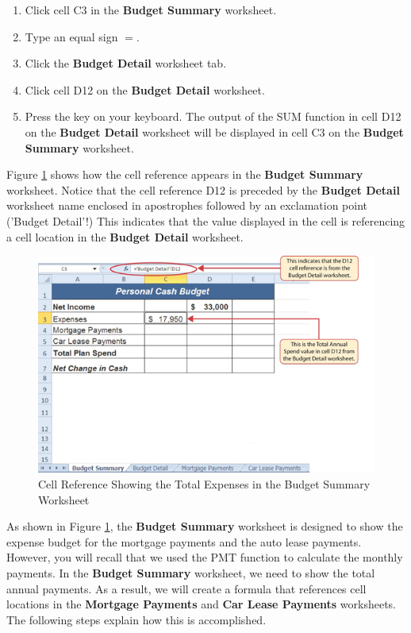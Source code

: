\begin{enumerate}
	\item Click cell \textsf{C3} in the \textbf{Budget Summary} worksheet.
	\item Type an equal sign $ = $.
	\item Click the \textbf{Budget Detail} worksheet tab.
	\item Click cell \textsf{D12} on the \textbf{Budget Detail} worksheet.
	\item Press the  key on your keyboard. The output of the SUM function in cell \textsf{D12} on the \textbf{Budget Detail} worksheet will be displayed in cell \textsf{C3} on the \textbf{Budget Summary} worksheet.
\end{enumerate}

Figure \ref{02:fig36} shows how the cell reference appears in the \textbf{Budget Summary} worksheet. Notice that the cell reference \textsf{D12} is preceded by the \textbf{Budget Detail} worksheet name enclosed in apostrophes followed by an exclamation point ('Budget Detail'!) This indicates that the value displayed in the cell is referencing a cell location in the \textbf{Budget Detail} worksheet.

\begin{figure}[H]
	\centering
	\includegraphics[width=\maxwidth{.95\linewidth}]{gfx/ch02_fig36}
	\caption{Cell Reference Showing the Total Expenses in the Budget Summary Worksheet}
	\label{02:fig36}
\end{figure}

As shown in Figure \ref{02:fig36}, the \textbf{Budget Summary} worksheet is designed to show the expense budget for the mortgage payments and the auto lease payments. However, you will recall that we used the PMT function to calculate the monthly payments. In the \textbf{Budget Summary} worksheet, we need to show the total annual payments. As a result, we will create a formula that references cell locations in the \textbf{Mortgage Payments} and \textbf{Car Lease Payments} worksheets. The following steps explain how this is accomplished.

